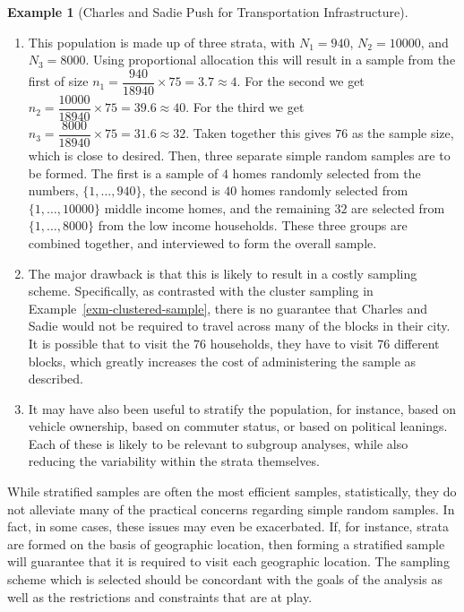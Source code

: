 \documentclass[
  letterpaper,
  DIV=11,
  numbers=noendperiod]{scrreprt}
\providecommand{\tightlist}{%
  \setlength{\itemsep}{0pt}\setlength{\parskip}{0pt}}\usepackage{longtable,booktabs,array}
\theoremstyle{definition}
\theoremstyle{definition}
\newtheorem{example}{Example}[chapter]
\theoremstyle{definition}
\theoremstyle{remark}
\begin{document}
\begin{example}[Charles and Sadie Push for Transportation
Infrastructure]
\begin{tcolorbox}[enhanced jigsaw, colback=white, colframe=quarto-callout-color-frame, arc=.35mm, leftrule=.75mm, rightrule=.15mm, opacityback=0, breakable, bottomrule=.15mm, left=2mm, toprule=.15mm]
\begin{enumerate}
\def\labelenumi{\alph{enumi}.}
\tightlist
\item
  This population is made up of three strata, with \(N_1 = 940\),
  \(N_2 = 10000\), and \(N_3 = 8000\). Using proportional allocation
  this will result in a sample from the first of size
  \(n_1 = \dfrac{940}{18940}\times 75 = 3.7 \approx 4\). For the second
  we get \(n_2 = \dfrac{10000}{18940}\times 75 = 39.6 \approx 40\). For
  the third we get
  \(n_3 = \dfrac{8000}{18940}\times 75 = 31.6 \approx 32\). Taken
  together this gives \(76\) as the sample size, which is close to
  desired. Then, three separate simple random samples are to be formed.
  The first is a sample of \(4\) homes randomly selected from the
  numbers, \(\{1,\dots,940\}\), the second is \(40\) homes randomly
  selected from \(\{1,\dots,10000\}\) middle income homes, and the
  remaining \(32\) are selected from \(\{1,\dots,8000\}\) from the low
  income households. These three groups are combined together, and
  interviewed to form the overall sample.
\item
  The major drawback is that this is likely to result in a costly
  sampling scheme. Specifically, as contrasted with the cluster sampling
  in Example~\ref{exm-clustered-sample}, there is no guarantee that
  Charles and Sadie would not be required to travel across many of the
  blocks in their city. It is possible that to visit the \(76\)
  households, they have to visit \(76\) different blocks, which greatly
  increases the cost of administering the sample as described.
\item
  It may have also been useful to stratify the population, for instance,
  based on vehicle ownership, based on commuter status, or based on
  political leanings. Each of these is likely to be relevant to subgroup
  analyses, while also reducing the variability within the strata
  themselves.
\end{enumerate}

\end{tcolorbox}

\end{example}

While stratified samples are often the most efficient samples,
statistically, they do not alleviate many of the practical concerns
regarding simple random samples. In fact, in some cases, these issues
may even be exacerbated. If, for instance, strata are formed on the
basis of geographic location, then forming a stratified sample will
guarantee that it is required to visit each geographic location. The
sampling scheme which is selected should be concordant with the goals of
the analysis as well as the restrictions and constraints that are at
play.
\end{document}
